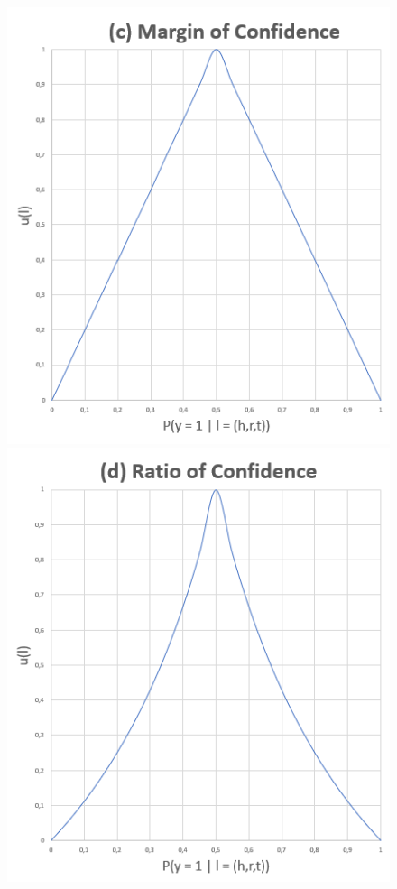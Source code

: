 \begin{figure}
\begin{minipage}{.5\textwidth}
    \end{minipage}
    \begin{minipage}{.5\textwidth}
      \centering
      \includegraphics[width=0.9\linewidth]{figures/smallest_margin_graph.PNG}
    \end{minipage}%
    \begin{minipage}{.5\textwidth}
      \centering
      \includegraphics[width=0.9\linewidth]{figures/smallest_ratio.PNG}

\end{minipage}
\end{figure}
